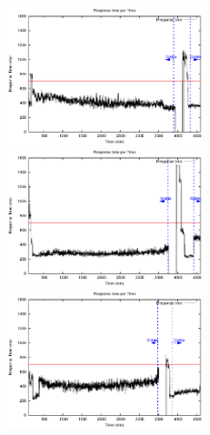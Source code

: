 




\begin{figure}[htb]
	\begin{minipage}[b]{0.20\linewidth}
		\vspace{-4mm}
		\includegraphics[width=\linewidth,height=4cm]{images/exps2011/low/das/proxyDataPoints_output.eps}	
		\vspace{-4mm}
	\end{minipage}
	\hfill
\begin{minipage}[b]{0.19\linewidth}
		\vspace{-4mm}
		\includegraphics[width=\linewidth,height=4cm]{images/exps2011/medium_down/das/proxyDataPoints_output.eps}
		\vspace{-4mm}
	\end{minipage}
\hfill
	\begin{minipage}[b]{0.2\linewidth}
		\vspace{-4mm}
		\includegraphics[width=\linewidth,height=4cm]{images/exps2011/medium/das/proxyDataPoints_output.eps}

\end{minipage}
\end{figure}
